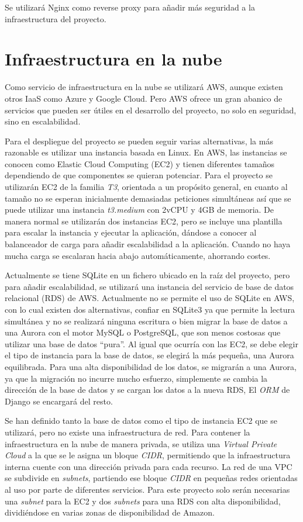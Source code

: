 Se utilizará Nginx como reverse proxy para añadir más seguridad a la infraestructura del proyecto.

\section{Infraestructura en la nube}
Como servicio de infraestructura en la nube se utilizará AWS, aunque existen otros IaaS como Azure y Google Cloud. Pero AWS ofrece un gran abanico de servicios que pueden ser útiles en el desarrollo del proyecto, no solo en seguridad, sino en escalabilidad. 

Para el despliegue del proyecto se pueden seguir varias alternativas, la más razonable es utilizar una instancia basada en Linux. En AWS, las instancias se conocen como Elastic Cloud Computing (EC2) y tienen diferentes tamaños dependiendo de que componentes se quieran potenciar. Para el proyecto se utilizarán EC2 de la familia \textit{T3}, orientada a un propósito general, en cuanto al tamaño no se esperan inicialmente demasiadas peticiones simultáneas así que se puede utilizar una instancia \textit{t3.medium} con 2vCPU y 4GB de memoria. De manera normal se utilizarán dos instancias EC2, pero se incluye una plantilla para escalar la instancia y ejecutar la aplicación, dándose a conocer al balanceador de carga para añadir escalabilidad a la aplicación. Cuando no haya mucha carga se escalaran hacia abajo automáticamente, ahorrando costes. 

Actualmente se tiene SQLite en un fichero ubicado en la raíz del proyecto, pero para añadir escalabilidad, se utilizará una instancia del servicio de base de datos relacional (RDS) de AWS. Actualmente no se permite el uso de SQLite en AWS, con lo cual existen dos alternativas, confiar en SQLite3 ya que permite la lectura simultánea y no se realizará ninguna escritura o bien migrar la base de datos a una Aurora con el motor MySQL o PostgreSQL, que son menos costosas que utilizar una base de datos ``pura''. Al igual que ocurría con las EC2, se debe elegir el tipo de instancia para la base de datos, se elegirá la más pequeña, una Aurora equilibrada. Para una alta disponibilidad de los datos, se migrarán a una Aurora, ya que la migración no incurre mucho esfuerzo, simplemente se cambia la dirección de la base de datos y se cargan los datos a la nueva RDS, El \textit{ORM} de Django se encargará del resto.

Se han definido tanto la base de datos como el tipo de instancia EC2 que se utilizará, pero no existe una infraestructura de red. Para contener la infraestructura en la nube de manera privada, se utiliza una \textit{Virtual Private Cloud} a la que se le asigna un bloque \textit{CIDR}, permitiendo que la infraestructura interna cuente con una dirección privada para cada recurso. La red de una VPC se subdivide en \textit{subnets}, partiendo ese bloque \textit{CIDR} en pequeñas redes orientadas al uso por parte de diferentes servicios. Para este proyecto solo serán necesarias una \textit{subnet} para la EC2 y dos \textit{subnets} para una RDS con alta disponibilidad, dividiéndose en varias zonas de disponibilidad de Amazon. 

